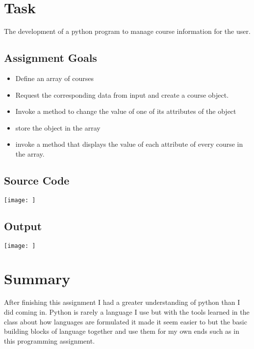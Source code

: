 \documentclass{report}
\begin{document}


\section*{Task}
The development of a python program to manage course information for the user. 

\vspace{0.5cm}

\subsection*{Assignment Goals}
\begin{itemize}

	\item Define an array of courses
	\item Request the corresponding data from input and create a course object.
	\item Invoke a method to change the value of one of its attributes of the object
	\item store the object in the array
	\item invoke a method that displays the value of each attribute of every course in the array.
\end{itemize}
\subsection*{Source Code}
\texttt{[image: ]}
\subsection*{Output}
\texttt{[image: ]}

\section{Summary}
After finishing this assignment I had a greater understanding of python than I did coming in. 
Python is rarely a language I use but with the tools learned in the class about how languages are formulated it made it seem easier to but the basic building blocks of language together and use them for my own ends such as in this programming assignment. 
\end{document}
